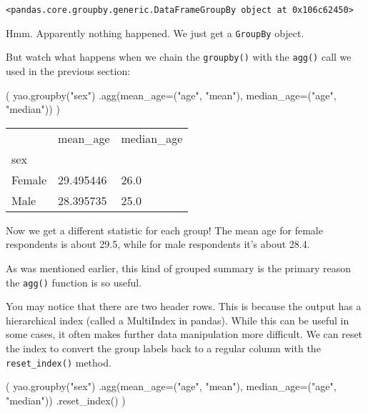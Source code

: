 \documentclass[
  letterpaper,
  DIV=11,
  numbers=noendperiod]{scrreprt}
\newenvironment{Shaded}{\begin{snugshade}}{\end{snugshade}}
\newcommand{\NormalTok}[1]{\textcolor[rgb]{0.00,0.23,0.31}{#1}}
\newcommand{\OperatorTok}[1]{\textcolor[rgb]{0.37,0.37,0.37}{#1}}
\newcommand{\StringTok}[1]{\textcolor[rgb]{0.13,0.47,0.30}{#1}}
\begin{document}
\begin{verbatim}
<pandas.core.groupby.generic.DataFrameGroupBy object at 0x106c62450>
\end{verbatim}

Hmm. Apparently nothing happened. We just get a \texttt{GroupBy} object.

But watch what happens when we chain the \texttt{groupby()} with the
\texttt{agg()} call we used in the previous section:

\begin{Shaded}
\begin{Highlighting}[]
\NormalTok{(}
\NormalTok{    yao.groupby(}\StringTok{"sex"}\NormalTok{)}
\NormalTok{    .agg(mean\_age}\OperatorTok{=}\NormalTok{(}\StringTok{"age"}\NormalTok{, }\StringTok{"mean"}\NormalTok{), median\_age}\OperatorTok{=}\NormalTok{(}\StringTok{"age"}\NormalTok{, }\StringTok{"median"}\NormalTok{))}
\NormalTok{)}
\end{Highlighting}
\end{Shaded}

\begin{longtable}[]{@{}lll@{}}
\toprule\noalign{}
& mean\_age & median\_age \\
sex & & \\
\midrule\noalign{}
\endhead
\bottomrule\noalign{}
\endlastfoot
Female & 29.495446 & 26.0 \\
Male & 28.395735 & 25.0 \\
\end{longtable}

Now we get a different statistic for each group! The mean age for female
respondents is about 29.5, while for male respondents it's about 28.4.

As was mentioned earlier, this kind of grouped summary is the primary
reason the \texttt{agg()} function is so useful.

You may notice that there are two header rows. This is because the
output has a hierarchical index (called a MultiIndex in pandas). While
this can be useful in some cases, it often makes further data
manipulation more difficult. We can reset the index to convert the group
labels back to a regular column with the \texttt{reset\_index()} method.

\begin{Shaded}
\begin{Highlighting}[]
\NormalTok{(}
\NormalTok{    yao.groupby(}\StringTok{"sex"}\NormalTok{)}
\NormalTok{    .agg(mean\_age}\OperatorTok{=}\NormalTok{(}\StringTok{"age"}\NormalTok{, }\StringTok{"mean"}\NormalTok{), median\_age}\OperatorTok{=}\NormalTok{(}\StringTok{"age"}\NormalTok{, }\StringTok{"median"}\NormalTok{))}
\NormalTok{    .reset\_index()}
\NormalTok{)}
\end{Highlighting}
\end{Shaded}
\end{document}
